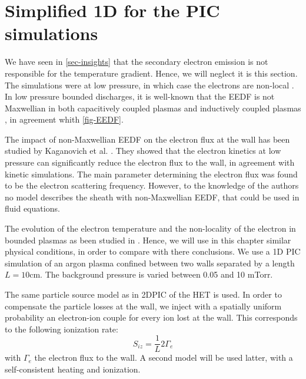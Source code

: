


\section{Simplified 1D for the PIC simulations}
\label{sec-1DPIC}

We have seen in \cref{sec-insights} that the secondary electron emission is not responsible for the temperature gradient.
Hence, we will neglect it is this section.
The simulations were at low pressure, in which case  the electrons are non-local \cite{bernstein1954, godyak1993}.
In low pressure bounded discharges, it is well-known that the EEDF is not Maxwellian in both capacitively coupled plasmas and inductively coupled plasmas \cite{mouchtouris2016, godyak2002, meige2006a, dominguez-vazquez2018}, in agreement whith \vref{fig-EEDF}.

The impact of non-Maxwellian EEDF on the electron flux at the wall has been studied by Kaganovich et al. \citep{kaganovich2000,kaganovich2007}.
They showed that the electron kinetics at low pressure can significantly reduce the electron flux to the wall, in agreement with kinetic simulations.
The main parameter determining the electron flux was found to be the electron scattering frequency.
However, to the knowledge of the authors no model describes the sheath with non-Maxwellian EEDF, that could be used in fluid equations.

The evolution of the electron temperature and the non-locality of the electron in bounded plasmas as been studied in \citet{meige2006a}.
Hence, we will use in this chapter similar physical conditions, in order to compare with there conclusions.
We use a 1D PIC simulation of an argon plasma confined between two walls separated by a length $L=10$cm.
The background pressure is varied between 0.05 and 10 mTorr.

The same particle source model as in \ac{2D}\ac{PIC} of the \ac{HET} is used.
In order to compensate the particle losses at the wall, we inject with a spatially uniform probability an electron-ion couple for every ion lost at the wall.
This corresponds to the following ionization rate:
\begin{equation}
  S_{iz} = \frac{1}{L} 2 \Gamma_e
\end{equation}
with $\Gamma_e$ the electron flux to the wall.
A second model will be used latter, with a self-consistent heating and ionization.

